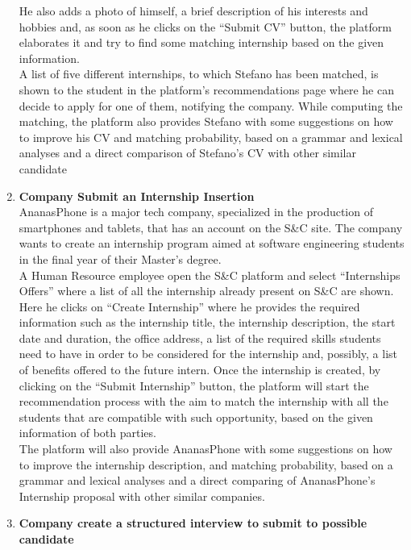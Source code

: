 \begin{enumerate}
        He also adds a photo of himself, a brief description of his interests and hobbies and, as soon as he clicks on the “Submit CV” button, the platform elaborates it and try to find some matching internship based on the given information.\\
        A list of five different internships, to which Stefano has been matched, is shown to the student in the platform's recommendations page where he can decide to apply for one of them, notifying the company.
        While computing the matching, the platform also provides Stefano with some suggestions on how to improve his CV and matching probability, based on a grammar and lexical analyses and a direct comparison of Stefano's CV with other similar candidate
    \item \textbf{\textcolor{titleColor}{Company Submit an Internship Insertion}}\\
        AnanasPhone is a major tech company, specialized in the production of smartphones and tablets, that has an account on the S\&C site. The company wants to create an internship program aimed at software engineering students in the final year of their Master's degree.\\
        A Human Resource employee open the S\&C platform and select “Internships Offers” where a list of all the internship already present on S\&C are shown. Here he clicks on “Create Internship” where he provides the required information such as the internship title, the internship description, the start date and duration, the office address, a list of the required skills students need to have in order to be considered for the internship and, possibly, a list of benefits offered to the future intern. Once the internship is created, by clicking on the “Submit Internship” button, the platform will start the recommendation process with the aim to match the internship with all the students that are compatible with such opportunity, based on the given information of both parties.\\
        The platform will also provide AnanasPhone with some suggestions on how to improve the internship description, and matching probability, based on a grammar and lexical analyses and a direct comparing of AnanasPhone's Internship proposal with other similar companies.
    \item \textbf{\textcolor{titleColor}{Company create a structured interview to submit to possible candidate}}\\

\end{enumerate}
